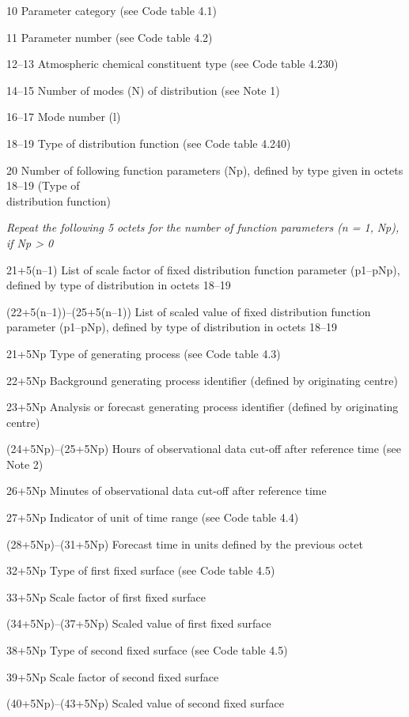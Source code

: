 10 Parameter category (see Code table 4.1)

11 Parameter number (see Code table 4.2)

12--13 Atmospheric chemical constituent type (see Code table 4.230)

14--15 Number of modes (N) of distribution (see Note 1)

16--17 Mode number (l)

18--19 Type of distribution function (see Code table 4.240)

20 Number of following function parameters (Np), defined by type given in octets 18--19 (Type of\\
distribution function)

\emph{Repeat the following 5 octets for the number of function parameters (n = 1,} \emph{Np), if Np \textgreater{} 0}

21+5(n--1) List of scale factor of fixed distribution function parameter (p1--pNp), defined by type of distribution in octets 18--19

(22+5(n--1))--(25+5(n--1)) List of scaled value of fixed distribution function parameter (p1--pNp), defined by type of distribution in octets 18--19

21+5Np Type of generating process (see Code table 4.3)

22+5Np Background generating process identifier (defined by originating centre)

23+5Np Analysis or forecast generating process identifier (defined by originating centre)

(24+5Np)--(25+5Np) Hours of observational data cut-off after reference time (see Note 2)

26+5Np Minutes of observational data cut-off after reference time

27+5Np Indicator of unit of time range (see Code table 4.4)

(28+5Np)--(31+5Np) Forecast time in units defined by the previous octet

32+5Np Type of first fixed surface (see Code table 4.5)

33+5Np Scale factor of first fixed surface

(34+5Np)--(37+5Np) Scaled value of first fixed surface

38+5Np Type of second fixed surface (see Code table 4.5)

39+5Np Scale factor of second fixed surface

(40+5Np)--(43+5Np) Scaled value of second fixed surface

